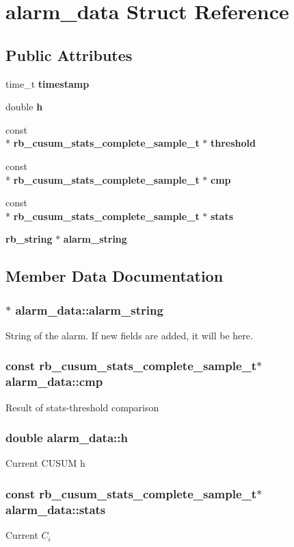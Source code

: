 \section{alarm\_data Struct Reference}
\label{structalarm__data}
\subsection*{Public Attributes}
\begin{DoxyCompactItemize}
\item 
time\_t {\bf timestamp}
\item 
double {\bf h}
\item 
const \\*
{\bf rb\_cusum\_stats\_complete\_sample\_t} $\ast$ {\bf threshold}
\item 
const \\*
{\bf rb\_cusum\_stats\_complete\_sample\_t} $\ast$ {\bf cmp}
\item 
const \\*
{\bf rb\_cusum\_stats\_complete\_sample\_t} $\ast$ {\bf stats}
\item 
{\bf rb\_string} $\ast$ {\bf alarm\_string}
\end{DoxyCompactItemize}


\subsection{Member Data Documentation}
\subsubsection[{alarm\_string}]{$\ast$ alarm\_data\+::alarm\_string}
String of the alarm. If new fields are added, it will be here.

\subsubsection[{cmp}]{\setlength{\rightskip}{0pt plus 5cm}const {\bf rb\_cusum\_stats\_complete\_sample\_t}$\ast$ alarm\_data\+::cmp}
Result of stats-threshold comparison

\subsubsection[{h}]{\setlength{\rightskip}{0pt plus 5cm}double alarm\_data\+::h}
Current CUSUM h

\subsubsection[{stats}]{\setlength{\rightskip}{0pt plus 5cm}const {\bf rb\_cusum\_stats\_complete\_sample\_t}$\ast$ alarm\_data\+::stats}
Current $C_i$

